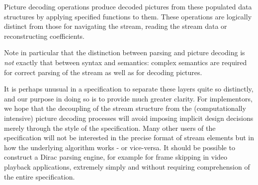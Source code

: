 Picture decoding operations produce decoded pictures from these populated
data structures by applying specified functions to them. These operations
are logically distinct from those for navigating the stream, reading the stream data
or reconstructing coefficients.

Note in particular that the distinction between parsing and picture decoding is
{\em not} exactly that between syntax and semantics: complex semantics are
required for correct parsing of the stream as well as for decoding pictures. 

It is perhaps unusual in a specification to separate these layers quite so distinctly, 
and our purpose in doing so is to provide much greater clarity. For implementors,
we hope that the decoupling of the stream structure from the (computationally intensive)
picture decoding processes will avoid imposing
implicit design decisions merely through the style of the specification. Many
other users of the specification will not be interested in the precise format
of stream elements but in how the underlying algorithm works - or vice-versa.
It should be possible to construct a Dirac parsing engine, for example for
frame skipping in video playback applications, extremely simply and without
requiring comprehension of the entire specification.

\begin{comment}
This layered structure is reflected in the structure of the specification,
which, after defining conventions used, is divided into three
corresponding parts: stream data access, defining functions for data types; 
accessing and parsing the Dirac bitstream and populating data
structures (including the wavelet coefficients and motion data); and 
high-level decoder operations and picture output, specifically the
inverse wavelet transform and motion compensation.

In addition to these parts, appendices deal with standard settings, parameter
presets and levels and profiles.
\end{comment}